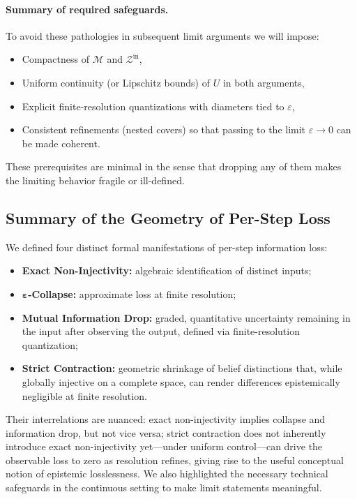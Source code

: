 \documentclass[12pt]{article}
\theoremstyle{definition}
\theoremstyle{plain}
\begin{document}
\paragraph{Summary of required safeguards.} To avoid these pathologies in subsequent limit arguments we will impose:
\begin{itemize}
  \item Compactness of \(\mathcal{M}\) and \(\mathcal{Z}^{\mathrm{in}}\),
  \item Uniform continuity (or Lipschitz bounds) of \(U\) in both arguments,
  \item Explicit finite-resolution quantizations with diameters tied to \(\varepsilon\),
  \item Consistent refinements (nested covers) so that passing to the limit \(\varepsilon\to0\) can be made coherent.
\end{itemize}
These prerequisites are minimal in the sense that dropping any of them makes the limiting behavior fragile or ill-defined.

\subsection{Summary of the Geometry of Per-Step Loss}

We defined four distinct formal manifestations of per-step information loss:
\begin{itemize}
  \item \textbf{Exact Non-Injectivity:} algebraic identification of distinct inputs;
  \item \(\mathbf{\varepsilon}\)\textbf{-Collapse:} approximate loss at finite resolution;
  \item \textbf{Mutual Information Drop:} graded, quantitative uncertainty remaining in the input after observing the output, defined via finite-resolution quantization;
  \item \textbf{Strict Contraction:} geometric shrinkage of belief distinctions that, while globally injective on a complete space, can render differences epistemically negligible at finite resolution.
\end{itemize}

Their interrelations are nuanced: exact non-injectivity implies collapse and information drop, but not vice versa; strict contraction does not inherently introduce exact non-injectivity yet—under uniform control—can drive the observable loss to zero as resolution refines, giving rise to the useful conceptual notion of epistemic losslessness.  We also highlighted the necessary technical safeguards in the continuous setting to make limit statements meaningful.
\end{document}
